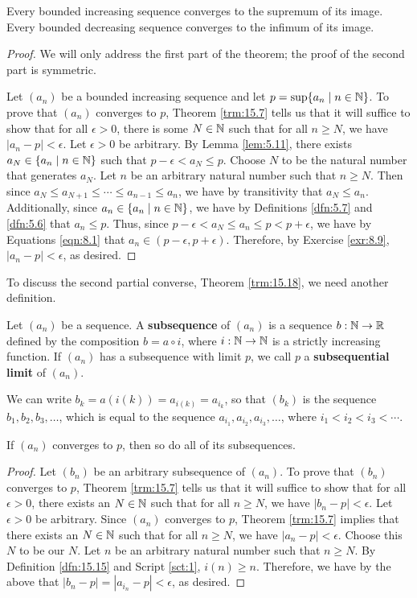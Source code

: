 \documentclass[../main.tex]{subfiles}
\begin{document}
\begin{theorem}\label{trm:15.14}
    Every bounded increasing sequence converges to the supremum of its image. Every bounded decreasing sequence converges to the infimum of its image.
    \begin{proof}
        We will only address the first part of the theorem; the proof of the second part is symmetric.\par
        Let $(a_n)$ be a bounded increasing sequence and let $p=\sup\{a_n\mid n\in\mathbb{N}\}$. To prove that $(a_n)$ converges to $p$, Theorem \ref{trm:15.7} tells us  that it will suffice to show that for all $\epsilon>0$, there is some $N\in\mathbb{N}$ such that for all $n\geq N$, we have $|a_n-p|<\epsilon$. Let $\epsilon>0$ be arbitrary. By Lemma \ref{lem:5.11}, there exists $a_N\in\{a_n\mid n\in\mathbb{N}\}$ such that $p-\epsilon<a_N\leq p$. Choose $N$ to be the natural number that generates $a_N$. Let $n$ be an arbitrary natural number such that $n\geq N$. Then since $a_N\leq a_{N+1}\leq\cdots\leq a_{n-1}\leq a_n$, we have by transitivity that $a_N\leq a_n$. Additionally, since $a_n\in\{a_n\mid n\in\mathbb{N}\}$, we have by Definitions \ref{dfn:5.7} and \ref{dfn:5.6} that $a_n\leq p$. Thus, since $p-\epsilon<a_N\leq a_n\leq p<p+\epsilon$, we have by Equations \ref{eqn:8.1} that $a_n\in(p-\epsilon,p+\epsilon)$. Therefore, by Exercise \ref{exr:8.9}, $|a_n-p|<\epsilon$, as desired.
    \end{proof}
\end{theorem}

To discuss the second partial converse, Theorem \ref{trm:15.18}, we need another definition.

\begin{definition}\label{dfn:15.15}
    Let $(a_n)$ be a sequence. A \textbf{subsequence} of $(a_n)$ is a sequence $b:\mathbb{N}\to\mathbb{R}$ defined by the composition $b=a\circ i$, where $i:\mathbb{N}\to\mathbb{N}$ is a strictly increasing function. If $(a_n)$ has a subsequence with limit $p$, we call $p$ a \textbf{subsequential limit} of $(a_n)$.
\end{definition}

We can write $b_k=a(i(k))=a_{i(k)}=a_{i_k}$, so that $(b_k)$ is the sequence $b_1,b_2,b_3,\dots$, which is equal to the sequence $a_{i_1},a_{i_2},a_{i_3},\dots$, where $i_1<i_2<i_3<\cdots$.

\begin{theorem}\label{trm:15.16}
    If $(a_n)$ converges to $p$, then so do all of its subsequences.
    \begin{proof}
        Let $(b_n)$ be an arbitrary subsequence of $(a_n)$. To prove that $(b_n)$ converges to $p$, Theorem \ref{trm:15.7} tells us that it will suffice to show that for all $\epsilon>0$, there exists an $N\in\mathbb{N}$ such that for all $n\geq N$, we have $|b_n-p|<\epsilon$. Let $\epsilon>0$ be arbitrary. Since $(a_n)$ converges to $p$, Theorem \ref{trm:15.7} implies that there exists an $N\in\mathbb{N}$ such that for all $n\geq N$, we have $|a_n-p|<\epsilon$. Choose this $N$ to be our $N$. Let $n$ be an arbitrary natural number such that $n\geq N$. By Definition \ref{dfn:15.15} and Script \ref{sct:1}, $i(n)\geq n$. Therefore, we have by the above that $|b_n-p|=|a_{i_n}-p|<\epsilon$, as desired.
    \end{proof}
\end{theorem}
\end{document}
